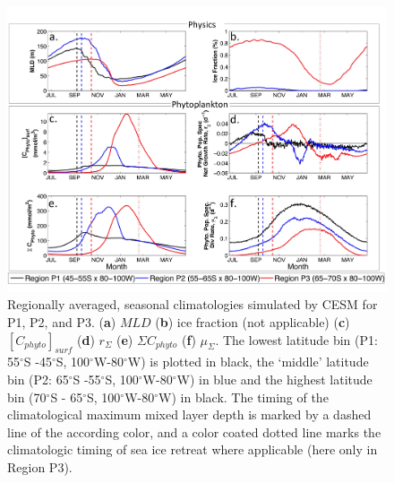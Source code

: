 \begin{figure}[!htbp]
\begin{adjustwidth}{-1in}{-1in}
 \centering
 \includegraphics[scale=.18]{figures/Ch2/Figure_5.jpg}
\end{adjustwidth}
\caption[Regionally averaged, seasonal climatologies simulated by CESM; P1, P2, and P3]{Regionally averaged, seasonal climatologies simulated by CESM for P1, P2, and P3. (\textbf{a}) $MLD$ (\textbf{b}) ice fraction (not applicable) (\textbf{c}) $[C_{phyto}]_{surf}$  (\textbf{d}) $r_\Sigma$ (\textbf{e}) $\Sigma C_{phyto}$ (\textbf{f}) $\mu_\Sigma$. The lowest latitude bin (P1: 55$^\circ$S -45$^\circ$S, 100$^\circ$W-80$^\circ$W) is plotted in black, the ‘middle’ latitude bin (P2: 65$^\circ$S -55$^\circ$S, 100$^\circ$W-80$^\circ$W) in blue and the highest latitude bin (70$^\circ$S - 65$^\circ$S, 100$^\circ$W-80$^\circ$W) in black. The timing of the climatological maximum mixed layer depth is marked by a dashed line of the according color, and a color coated dotted line marks the climatologic timing of sea ice retreat where applicable (here only in Region P3). 
}
\label{fig:Fig5}
\end{figure}




